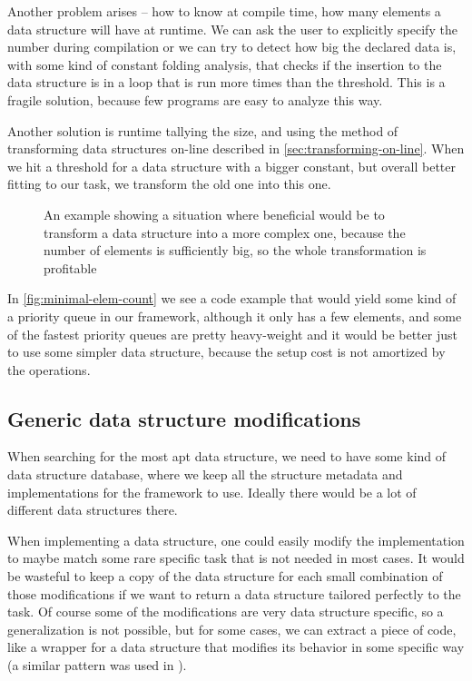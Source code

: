 \documentclass[a4paper,11pt]{article}
\begin{document}
		Another problem arises -- how to know at compile time, how many elements a data structure will have at
		runtime. We can ask the user to explicitly specify the number during compilation or we can try to
		detect how big the declared data is, with some kind of constant folding analysis, that checks if the
		insertion to the data structure is in a loop that is run more times than the threshold. This is a fragile
		solution, because few programs are easy to analyze this way.

		Another solution is runtime tallying the size, and using the method of transforming data structures
		on-line described in \autoref{sec:transforming-on-line}. When we hit a threshold for a data structure
		with a bigger constant, but overall better fitting to our task, we transform the old one into this one.

		\begin{figure}
			

			\caption{An example showing a situation where beneficial would be to transform a data structure
				into a more complex one, because the number of elements is sufficiently big, so the
				whole transformation is profitable}

			\label{fig:minimal-elem-count}
		\end{figure}

        In \autoref{fig:minimal-elem-count} we see a code example that would yield some kind of a priority queue in our
        framework, although it only has a few elements, and some of the fastest priority queues are pretty heavy-weight
        and it would be better just to use some simpler data structure, because the setup cost is not amortized by the
        operations.

	\subsection{Generic data structure modifications} \label{sub:gdsm}

		When searching for the most apt data structure, we need to have some kind of data structure database,
		where we keep all the structure metadata and implementations for the framework to use. Ideally there
		would be a lot of different data structures there.

		When implementing a data structure, one could easily modify the implementation to maybe match some rare
		specific task that is not needed in most cases. It would be wasteful to keep a copy of the data
		structure for each small combination of those modifications if we want to return a data structure
		tailored perfectly to the task. Of course some of the modifications are very data structure specific, so
		a generalization is not possible, but for some cases, we can extract a piece of code, like a wrapper for
        a data structure that modifies its behavior in some specific way (a similar pattern was used in
        \cite{Okasaki}).
\end{document}

